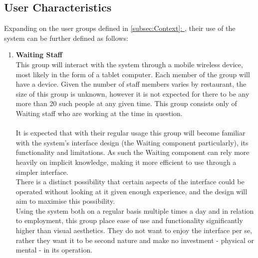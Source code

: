 \documentclass[11pt, a4paper]{report}
\newcommand{\gref}[1]{\hyperref[#1]{\autoref*{#1}: \nameref{#1}}} %
\begin{document}

\subsection{User Characteristics} \label{subsec:Characteristics}
Expanding on the user groups defined in \gref{subsec:Context}, their use of the system can be further defined as follows:

\begin{enumerate}
\item \textbf{Waiting Staff} \\This group will interact with the system through a mobile wireless device, most likely in the form of a tablet computer. Each member of the group will have a device. Given the number of staff members varies by restaurant, the size of this group is unknown, however it is not expected for there to be any more than 20 such people at any given time. This group consists only of Waiting staff who are working at the time in question.\\ \\
It is expected that with their regular usage this group will become familiar with the system's interface design (the Waiting component particularly), its functionality and limitations. As such the Waiting component can rely more heavily on implicit knowledge, making it more efficient to use through a simpler interface.\\
There is a distinct possibility that certain aspects of the interface could be operated without looking at it given enough experience, and the design will aim to maximise this possibility.\\
Using the system both on a regular basis multiple times a day and in relation to employment, this group place ease of use and functionality significantly higher than visual aesthetics. They do not want to enjoy the interface per se, rather they want it to be second nature and make no investment - physical or mental - in its operation.



\end{enumerate}
\end{document}
